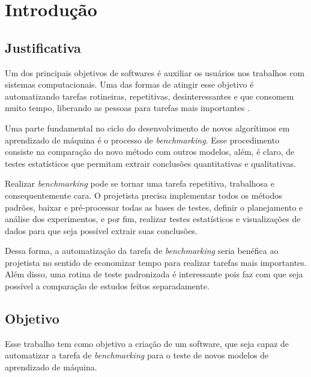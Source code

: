 
\chapter{Introdução}
\label{chap:introducao}

\section{Justificativa}
\label{sec:justificativa}
Um dos principais objetivos de softwares é auxiliar os usuários nos trabalhos com sistemas computacionais. Uma das formas de atingir esse objetivo é automatizando tarefas rotineiras, repetitivas, desinteressantes e que consomem muito tempo, liberando as pessoas para tarefas mais importantes \cite{Zambiasi2012UmaAA}. 

Uma parte fundamental no ciclo do desenvolvimento de novos algorítimos em aprendizado de máquina é o processo de \textit{benchmarking}. Esse procedimento consiste na comparação do novo método com outros modelos, além, é claro, de testes estatísticos que permitam extrair conclusões quantitativas e qualitativas.

Realizar \textit{benchmarking} pode se tornar uma tarefa repetitiva, trabalhosa e consequentemente cara. O projetista precisa implementar todos os métodos padrões, baixar e pré-processar todas as bases de testes, definir o planejamento e análise dos experimentos, e por fim, realizar testes estatísticos e visualizações de dados para que seja possível extrair suas conclusões.

Dessa forma, a automatização da tarefa de \textit{benchmarking} seria benéfica ao projetista no sentido de economizar tempo para realizar tarefas mais importantes. Além disso, uma rotina de teste padronizada é interessante pois faz com que seja possível a comparação de estudos feitos separadamente.


\section{Objetivo}
\label{sec:objetivo}
Esse trabalho tem como objetivo a criação de um software, que seja capaz de automatizar a tarefa de \textit{benchmarking} para o teste de novos modelos de aprendizado de máquina. 

